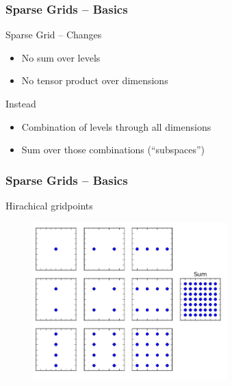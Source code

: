 \begin{frame}
  \frametitle{Sparse Grids -- Basics}
  \topline
  \vspace{-10px}
  \begin{block}{Sparse Grid -- Changes}
    \begin{itemize}
      \item No sum over levels
      \item No tensor product over dimensions
    \end{itemize}
  \end{block}
  \begin{block}{Instead}
    \begin{itemize}
      \item Combination of levels through all dimensions
      \item Sum over those combinations (``subspaces'')
    \end{itemize}
  \end{block}
\end{frame}

\begin{frame}
  \frametitle{Sparse Grids -- Basics}
  \topline
  \vspace{-10px}
  \begin{block}{Hirachical gridpoints}
    \begin{figure}[!htp]
      \centering
      \includegraphics[width=7.5cm]{images/sparsegrid_hirach1}
      \vspace{-12px}
      \caption{}
    \end{figure}
  \end{block}
\end{frame}

